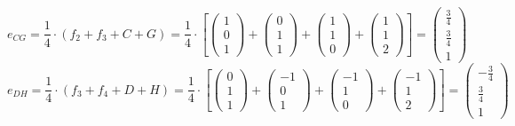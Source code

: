 \documentclass{article}
\begin{document}
\[e_{CG}=\frac{1}{4}\cdot(f_2+f_3+C+G)=\frac{1}{4}\cdot\left[
\left({\begin{array}{c} 1 \\  0 \\ 1 \end{array}}\right)+
\left({\begin{array}{c} 0 \\ 1 \\ 1 \end{array}}\right)+
\left({\begin{array}{c} 1 \\ 1 \\ 0 \end{array}}\right)+
\left({\begin{array}{c} 1 \\  1 \\ 2 \end{array}}\right)\right]=
\left({\begin{array}{c}  \frac{3}{4} \\ \frac{3}{4} \\ 1 \end{array}}\right)
\]
\[e_{DH}=\frac{1}{4}\cdot(f_3+f_4+D+H)=\frac{1}{4}\cdot\left[
\left({\begin{array}{c} 0 \\  1 \\ 1 \end{array}}\right)+
\left({\begin{array}{c} -1 \\ 0 \\ 1 \end{array}}\right)+
\left({\begin{array}{c} -1 \\ 1 \\ 0 \end{array}}\right)+
\left({\begin{array}{c} -1 \\  1 \\ 2 \end{array}}\right)\right]=
\left({\begin{array}{c}  -\frac{3}{4} \\ \frac{3}{4} \\ 1 \end{array}}\right)
\]
\end{document}
